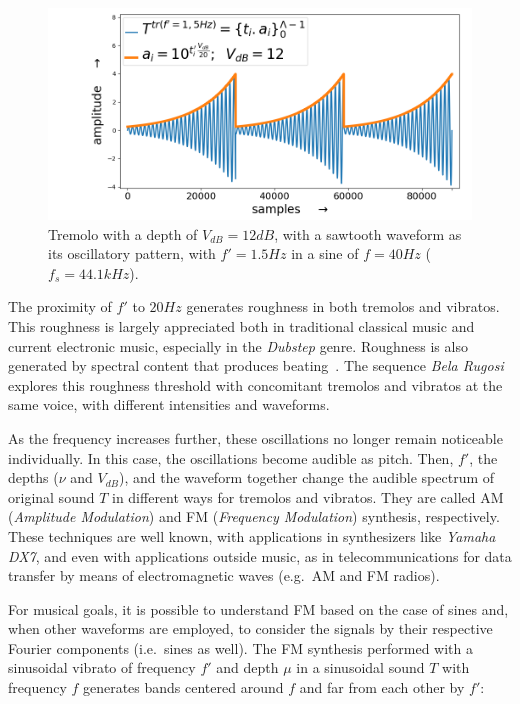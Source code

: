 \begin{figure}
     \centering
         \includegraphics[width=\textwidth]{figures/tremolo_}
     \caption{Tremolo with a depth of $V_{dB}=12dB$, with a sawtooth waveform as its oscillatory pattern, with $f'=1.5Hz$ in a sine of $f=40Hz$ ($f_s=44.1kHz$).}
         \label{fig:tremolo}
\end{figure}

The proximity of $f'$ to $20Hz$ generates roughness in both tremolos and vibratos. This roughness is largely appreciated both in traditional classical music and current electronic music, especially in the \emph{Dubstep} genre. Roughness is also generated by spectral content that produces beating~\cite{Porres,porres2009}. The sequence \emph{Bela Rugosi} explores this roughness threshold with concomitant tremolos and vibratos at the same voice, with different intensities and waveforms.~\cite{MASSA}

As the frequency increases further, these oscillations no longer remain noticeable individually.
In this case, the oscillations become audible as pitch.
Then, $f'$,
the depths ($\nu$ and $V_{dB}$),
and the waveform together change the audible spectrum of original sound $T$ in different ways for tremolos and vibratos. They are called AM (\emph{Amplitude Modulation}) and FM (\emph{Frequency Modulation}) synthesis,
respectively. These techniques are well known, with applications in
synthesizers like \emph{Yamaha DX7}, and even with applications outside music, as in telecommunications for data transfer by means of electromagnetic waves (e.g.\ AM and FM radios).

For musical goals, it is possible to understand FM based on the
case of sines and, when other waveforms are employed, to consider the signals by their respective Fourier components (i.e.\ sines as well).
The FM synthesis performed with a sinusoidal vibrato of frequency $f'$ and depth $\mu$ in a sinusoidal sound $T$ with frequency $f$ generates bands centered around $f$ and far from each other by $f'$:


